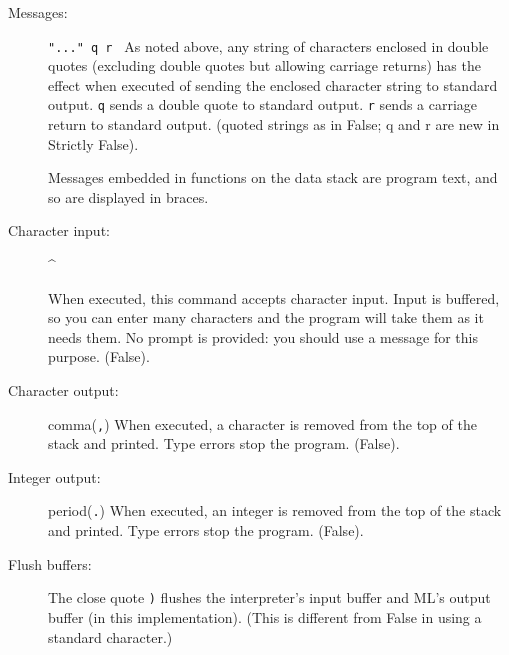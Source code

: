 \documentclass[12pt]{article}
\begin{document}
\begin{description}

\item[Messages:] {\tt "..."  q r } As noted above, any string of
characters enclosed in double quotes (excluding double quotes but
allowing carriage returns) has the effect when executed of sending the
enclosed character string to standard output.  {\tt q} sends a double
quote to standard output.  {\tt r} sends a carriage return to standard
output.  (quoted strings as in False; q and r are new in Strictly
False).

Messages embedded in functions on the data stack are program text,
and so are displayed in braces.

\item[Character input:] \begin{verb} ^ \end{verb}  When executed, this
command accepts character input.  Input is buffered, so you can enter
many characters and the program will take them as it needs them.  No
prompt is provided:  you should use a message for this purpose.  (False).

\item[Character output:] comma({\tt ,})  When executed, a character
is removed from the top of the stack and printed.  Type errors stop
the program.  (False).

\item[Integer output:] period({\tt .})  When executed, an integer is
removed from the top of the stack and printed.  Type errors stop
the program.  (False).

\item[Flush buffers:]  The close quote {\tt )} flushes the interpreter's
input buffer and ML's output buffer (in this implementation).  (This
is different from False in using a standard character.)

\end{description}
\end{document}
